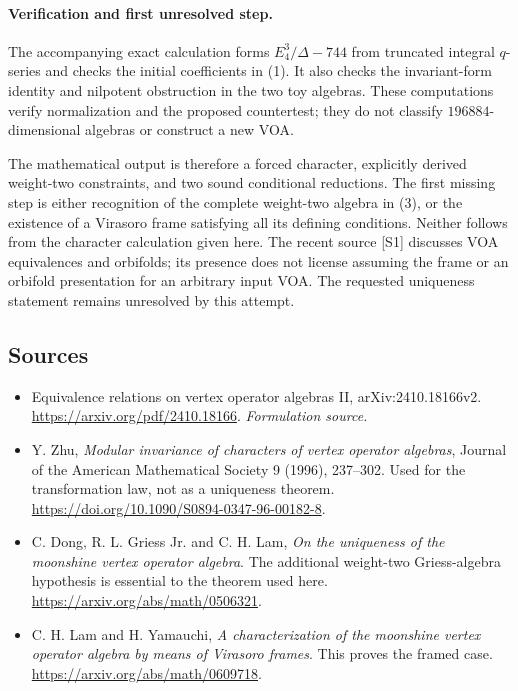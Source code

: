 \documentclass[11pt]{article}
\begin{document}
\paragraph{Verification and first unresolved step.}
The accompanying exact calculation forms $E_4^3/\Delta-744$ from truncated integral $q$-series and checks the initial coefficients in (1). It also checks the invariant-form identity and nilpotent obstruction in the two toy algebras. These computations verify normalization and the proposed countertest; they do not classify $196884$-dimensional algebras or construct a new VOA.

The mathematical output is therefore a forced character, explicitly derived weight-two constraints, and two sound conditional reductions. The first missing step is either recognition of the complete weight-two algebra in (3), or the existence of a Virasoro frame satisfying all its defining conditions. Neither follows from the character calculation given here. The recent source [S1] discusses VOA equivalences and orbifolds; its presence does not license assuming the frame or an orbifold presentation for an arbitrary input VOA. The requested uniqueness statement remains unresolved by this attempt.

\subsection{Sources}
\begin{itemize}
\item[S1]Equivalence relations on vertex operator algebras II, arXiv:2410.18166v2.
\url{https://arxiv.org/pdf/2410.18166}.
\textit{Formulation source.}
\item[E1]Y. Zhu, \textit{Modular invariance of characters of vertex operator algebras}, Journal of the American Mathematical Society 9 (1996), 237--302. Used for the transformation law, not as a uniqueness theorem.
\url{https://doi.org/10.1090/S0894-0347-96-00182-8}.
\item[E2]C. Dong, R. L. Griess Jr. and C. H. Lam, \textit{On the uniqueness of the moonshine vertex operator algebra}. The additional weight-two Griess-algebra hypothesis is essential to the theorem used here.
\url{https://arxiv.org/abs/math/0506321}.
\item[E3]C. H. Lam and H. Yamauchi, \textit{A characterization of the moonshine vertex operator algebra by means of Virasoro frames}. This proves the framed case.
\url{https://arxiv.org/abs/math/0609718}.

\end{itemize}
\end{document}
